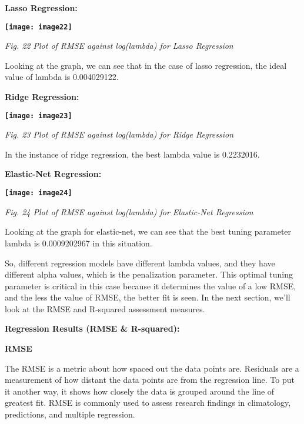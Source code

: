 \documentclass{article} %
\begin{document}
\noindent \textbf{Lasso Regression:}

\noindent \textbf{\texttt{[image: image22]}}

\noindent \textit{Fig. 22 Plot of RMSE against log(lambda) for Lasso Regression }

\noindent Looking at the graph, we can see that in the case of lasso regression, the ideal value of lambda is 0.004029122. 

\noindent \textbf{Ridge Regression:}

\noindent \textbf{\texttt{[image: image23]}}

\noindent \textit{Fig. 23 Plot of RMSE against log(lambda) for Ridge Regression }

\noindent \textbf{}

\noindent In the instance of ridge regression, the best lambda value is 0.2232016.

\noindent 

\noindent \textbf{Elastic-Net Regression: }

\noindent \textbf{\texttt{[image: image24]}}

\noindent \textit{Fig. 24 Plot of RMSE against log(lambda) for Elastic-Net Regression }

\noindent \textbf{}

\noindent Looking at the graph for elastic-net, we can see that the best tuning parameter lambda is 0.0009202967 in this situation.

\noindent So, different regression models have different lambda values, and they have different alpha values, which is the penalization parameter. This optimal tuning parameter is critical in this case because it determines the value of a low RMSE, and the less the value of RMSE, the better fit is seen. In the next section, we'll look at the RMSE and R-squared assessment measures.

\noindent \textbf{Regression Results (RMSE \& R-squared):}

\noindent \textbf{RMSE}

\noindent The RMSE is a metric about how spaced out the data points are. Residuals are a measurement of how distant the data points are from the regression line. To put it another way, it shows how closely the data is grouped around the line of greatest fit. RMSE is commonly used to assess research findings in climatology, predictions, and multiple regression.
\end{document}
